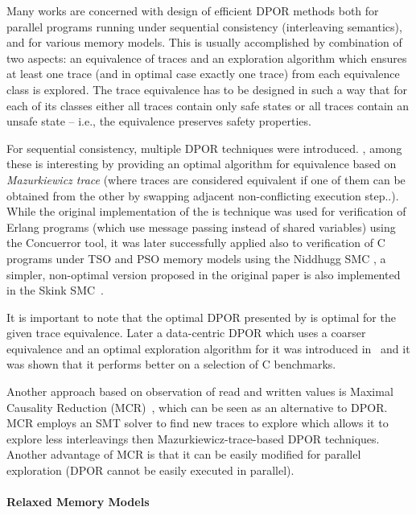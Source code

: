 Many works are concerned with design of efficient DPOR methods both for
parallel programs running under sequential consistency (interleaving
semantics), and for various memory models.
This is usually accomplished by combination of two aspects: an equivalence of
traces and an exploration algorithm which ensures at least one trace (and in
optimal case exactly one trace) from each equivalence class is explored.
The trace equivalence has to be designed in such a way that for each of its
classes either all traces contain only safe states or all traces contain an
unsafe state -- i.e., the equivalence preserves safety properties.

For sequential consistency, multiple DPOR techniques were introduced.
 \cite{TODO,TODO}, among these \cite{Abdulla2014} is interesting by providing an optimal algorithm for equivalence based on \emph{Mazurkiewicz trace} \cite{Abdulla2014:17} (where traces are considered equivalent if one of them can be obtained from the other by swapping adjacent non-conflicting execution step..).
While the original implementation of the is technique was used for verification of Erlang programs (which use message passing instead of shared variables) using the Concuerror tool, it was later successfully applied also to verification of C programs under TSO and PSO memory models using the Niddhugg SMC \cite{Abdulla2017tso}, a simpler, non-optimal version proposed in the original paper is also implemented in the Skink SMC~\cite{Cassez2017}.

It is important to note that the optimal DPOR presented by \cite{Abdulla2014}
is optimal for the given trace equivalence.
Later a data-centric DPOR which uses a coarser equivalence and an optimal
exploration algorithm for it was introduced in~\cite{Chalupa2017} and it was
shown that it performs better on a selection of C benchmarks.

Another approach based on observation of read and written values is Maximal
Causality Reduction (MCR)~\cite{Huang2015}, which can be seen as an alternative
to DPOR.
MCR employs an SMT solver to find new traces to explore which allows it to
explore less interleavings then Mazurkiewicz-trace-based DPOR techniques.
Another advantage of MCR is that it can be easily modified for parallel
exploration (DPOR cannot be easily executed in parallel).


\paragraph{Relaxed Memory Models}

